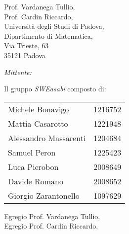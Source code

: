 \documentclass{article}
\begin{document}
\begin{center}
\begin{minipage}[t]{0.49\linewidth}
\begin{flushleft}
\begin{minipage}[t]{0.8\linewidth}
\begin{flushleft}
            Prof. Vardanega Tullio,\\
            Prof. Cardin Riccardo,\\
            Università degli Studi di Padova,\\
            Dipartimento di Matematica,\\
            Via Trieste, 63\\
            35121 Padova\\        
        \end{flushleft}
        \end{minipage}
        \end{flushleft}
    \end{minipage}
    \begin{minipage}[t]{0.49\linewidth}
        \begin{flushright}

        \begin{minipage}[t]{1\linewidth}
            
        \begin{flushright}
        \normalsize
        \textit{Mittente:}
        \vspace{0.5cm}

        Il gruppo \textit{SWEasabi} composto di:
            \begin{tabularx}{0.87\linewidth}{l | X}
                Michele Bonavigo & 1216752 \\
                Mattia Casarotto & 1221948 \\
                Alessandro Massarenti & 1204684 \\
                Samuel Peron & 1225423 \\
                Luca Pierobon & 2008649 \\
                Davide Romano & 2008652 \\
                Giorgio Zarantonello & 1097629 
            \end{tabularx}
        \end{flushright}
        \end{minipage}
        \end{flushright}
    \end{minipage}
    
    \normalsize
\end{center}

\vspace{1,5cm}

Egregio Prof. Vardanega Tullio,\\
Egregio Prof. Cardin Riccardo,\\
\end{document}

